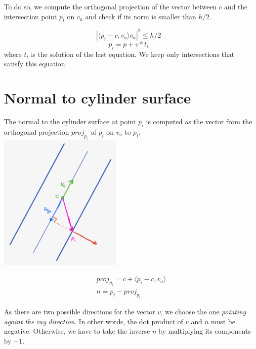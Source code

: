 \documentclass{article}
\begin{document}
To do so, we compute the orthogonal projection of the vector between $c$ and the intersection point $p_i$ on $v_a$ and check if its norm is smaller than $h/2$.

$$|\langle p_i-c, v_a\rangle v_a|^2 \leq h/2$$
$$p_i = p+v*t_i$$
where $t_i$ is the solution of the last equation. We keep only intersections that satisfy this equation.

\section{Normal to cylinder surface}

The normal to the cylinder surface at point $p_i$ is computed as the vector from the orthogonal projection $proj_{p_i}$ of $p_i$ on $v_a$ to $p_i$.
\\

\centering
\includegraphics[width=6cm]{res/Normal_sketch.jpeg}


\begin{align*}
    &proj_{p_i} = c + \langle p_i-c, v_a \rangle \\
    &n = p_i - proj_{p_i}
\end{align*}

As there are two possible directions for the vector $v$, we choose the one \textit{pointing againt the ray direction}. In other words, the dot product of $v$ and $n$ must be negative. Otherwise, we have to take the inverse $n$ by multiplying its components by $-1$.
\end{document}
